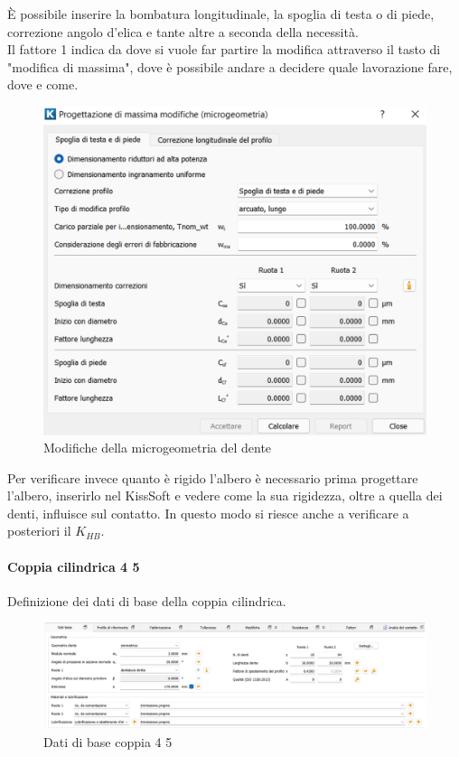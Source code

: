 È possibile inserire la bombatura longitudinale, la spoglia di testa o di piede, correzione angolo d’elica e tante altre a seconda della necessità.\\
Il fattore 1 indica da dove si vuole far partire la modifica attraverso il tasto di "modifica di massima", dove è possibile andare a decidere quale lavorazione fare, dove e come. 
\begin{figure}[h]
    \centering
    \includegraphics[scale=0.35]{Immagini/ModificheMicrogeometria.png}
    \caption{Modifiche della microgeometria del dente}
    \label{fig:ModificheMicrogeometria}
\end{figure}

Per verificare invece quanto è rigido l’albero è necessario prima progettare l’albero, inserirlo nel KissSoft e vedere come la sua rigidezza, oltre a quella dei denti, influisce sul contatto. In questo modo si riesce anche a verificare a posteriori il $K_{HB}$.
\newpage
\paragraph{Coppia cilindrica 4 5} Definizione dei dati di base della coppia cilindrica.  
\begin{figure}[h]
    \centering
    \includegraphics[scale=0.4]{Immagini/Coppia45.png}
    \caption{Dati di base coppia 4 5}
    \label{fig:Coppia45}
\end{figure}

